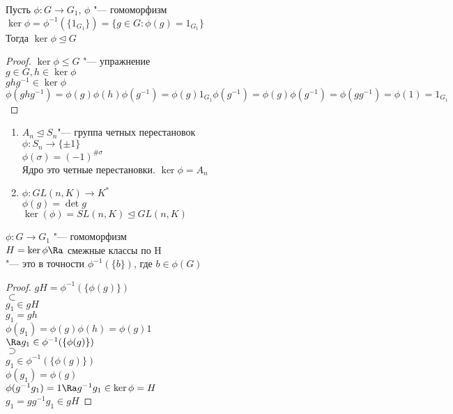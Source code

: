 \begin{theorem}
Пусть $\phi\colon G \to G_1$, $\phi$ "--- гомоморфизм\\
$\ker \phi = \phi^{-1}(\{1_{G_1}\}) = \{g \in G \colon \phi(g) = 1_{G_1}\}$ \\
Тогда $\ker \phi \unlhd G$\\
\end{theorem}
\begin{proof}
$\ker \phi \le G$ "--- упражнение\\
$g \in G, h \in \ker \phi$\\
$ghg^{-1} \in \ker \phi$\\
$\phi(ghg^{-1}) = \phi(g)\phi(h)\phi(g^{-1}) = \phi(g)1_{G_1}\phi(g^{-1}) = \phi(g)\phi(g^{-1}) = \phi(gg^{-1}) = \phi(1) = 1_{G_1}$\\
\end{proof}
\begin{exmp}      
\begin{enumerate} 
\item
$A_n \unlhd S_n$"--- группа четных перестановок\\
$\phi \colon S_n \to \{\pm 1\}$\\
$\phi(\sigma) = (-1)^{\#\sigma}$ \\
Ядро это четные перестановки.
$\ker \phi  = A_n$

\item 
$\phi \colon GL(n,K) \to K^*$\\
$\phi(g) = \det g$\\
$\ker(\phi) = SL(n, K) \unlhd GL(n, K)$\\
\end{enumerate}
\end{exmp}

\begin{lemma}
$\phi\colon G \to G_1$ "--- гомоморфизм\\
$H = \ker \phi \Ra$ смежные классы по H\\
"--- это в точности $\phi^{-1}(\{b\})$, где $b \in \phi(G)$\\
\end{lemma}
\begin{proof}
$gH = \phi^{-1}(\{\phi(g)\})$\\
$\subset$\\
$g_1 \in gH$\\
$g_1 = gh$\\
$\phi(g_1) = \phi(g)\phi(h) = \phi(g)1$ \\
$\Ra g_1 \in \phi^{-1}(\{\phi(g)\})$\\
$\supset$\\
$g_1 \in \phi^{-1}(\{\phi(g)\})$ \\
$\phi(g_1) = \phi(g)$\\
$\phi(g^{-1}g_1) = 1 \Ra g^{-1}g_1 \in \ker \phi = H$\\
$g_1 = gg^{-1}g_1 \in gH$
\end{proof}


